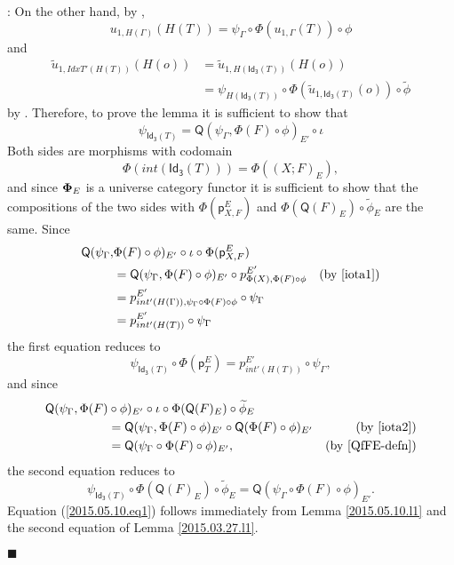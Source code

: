 \documentclass[12pt]{article}
\numberwithin{equation}{section}
\newenvironment{eq}{\begin{equation}}{\end{equation}}
\newenvironment{myproof}{{\bf Proof}:}{$\blacksquare$ \vskip 5mm }
\newcommand{\by}[1]{\text{(by #1)}}
\newcommand{\wt}{\widetilde}
\newcommand{\p}{\mathsf{p}}
\newcommand{\Idx}{\mathsf{Id_3}} %
\newcommand{\Q}{\mathsf{Q}}
\begin{document}
\begin{myproof}
On the other hand, by \cite[Lemma 6.1(1)]{fromunivwithPi},
%
$$u_{1,H(\Gamma)}(H(T))=\psi_{\Gamma}\circ \Phi(u_{1,\Gamma}(T))\circ \phi$$
and
\begin{align*}
  \wt{u}_{1,IdxT'(H(T))}(H(o))
    & = \wt{u}_{1,H(\Idx(T))}(H(o)) \\
    & = \psi_{H(\Idx(T))}\circ \Phi(\wt{u}_{1,\Idx(T)}(o))\circ \wt{\phi}
\end{align*}
%
by \cite[Lemma 6.1(1,2)]{fromunivwithPi}. Therefore, to prove the lemma it is
sufficient to show that
%
$$\psi_{\Idx(T)}=\Q(\psi_{\Gamma},\Phi(F)\circ\phi)_{E'}\circ\iota$$
%
Both sides are morphisms with codomain
%
$$\Phi(int(\Idx(T)))=\Phi((X;F)_E),$$
%
and since ${\bf\Phi}_E$ is a universe category functor it is sufficient to show
that the compositions of the two sides with $\Phi(\p^E_{X,F})$ and
$\Phi(\Q(F)_E)\circ \wt{\phi}_E$ are the same.  Since
%
\begin{align*}
        \Q(\psi_{\Gamma},&\Phi(F)\circ\phi)_{E'} \circ \iota\circ \Phi(\p^E_{X,F}) \\
    & = \Q(\psi_{\Gamma}, \Phi(F)\circ\phi)_{E'} \circ p^{E'}_{\Phi(X),\Phi(F)\circ\phi} & \by{\ref{iota1}} \\
    & = p^{E'}_{int'(H(\Gamma)),\psi_{\Gamma} \circ \Phi(F)\circ\phi} \circ \psi_\Gamma  \\
    & = p^{E'}_{int'(H(T))}\circ\psi_{\Gamma}
\end{align*}
%
the first equation reduces to
%
\begin{eq}
  \label{2015.05.10.eq1}
  \psi_{\Idx(T)}\circ \Phi(\p^E_{T}) = p^{E'}_{int'(H(T))}\circ\psi_{\Gamma},
\end{eq}%
%
and since
%
\begin{align*}
        \Q(\psi_{\Gamma},\Phi(F)&\circ\phi)_{E'}\circ \iota\circ \Phi(\Q(F)_E)\circ \wt{\phi}_E \\
    & = \Q(\psi_{\Gamma},\Phi(F) \circ\phi)_{E'}\circ \Q(\Phi(F)\circ\phi)_{E'}                 & \by{\ref{iota2}} \\
    & = \Q(\psi_{\Gamma}\circ \Phi(F)\circ \phi)_{E'},                                           & \by{\ref{QfFE-defn}}
\end{align*}
%
the second equation reduces to
%
\begin{eq}
  \label{2015.05.10.eq2.0}
  \psi_{\Idx(T)}\circ \Phi(\Q(F)_E)\circ \wt{\phi}_E = \Q(\psi_{\Gamma}\circ \Phi(F)\circ \phi)_{E'}.
\end{eq}%
%
Equation (\ref{2015.05.10.eq1}) follows immediately from Lemma
\ref{2015.05.10.l1} and the second equation of Lemma \ref{2015.03.27.l1}.


\end{myproof}
\end{document}
